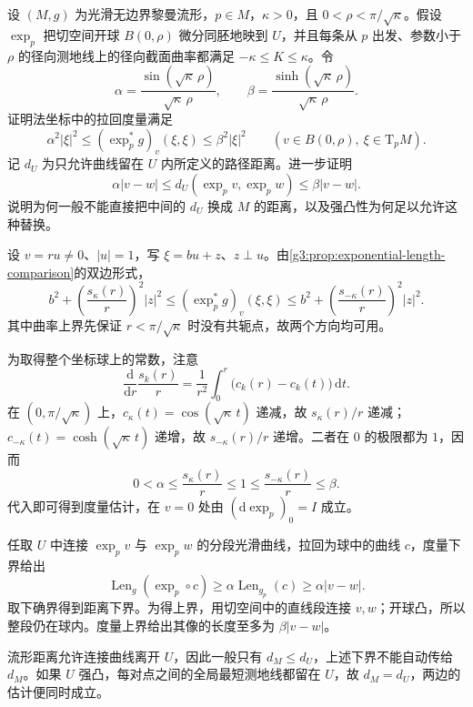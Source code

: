 \begin{exercise}\label{g3:ex:normal-coordinate-bilipschitz}
	设 \((M,g)\) 为光滑无边界黎曼流形，\(p\in M\)，\(\kappa>0\)，且 \(0<\rho<\pi/\sqrt\kappa\)。假设 \(\exp_p\) 把切空间开球 \(B(0,\rho)\) 微分同胚地映到 \(U\)，并且每条从 \(p\) 出发、参数小于 \(\rho\) 的径向测地线上的径向截面曲率都满足 \(-\kappa\le K\le\kappa\)。令
	\[
		\alpha=\frac{\sin(\sqrt\kappa\,\rho)}{\sqrt\kappa\,\rho},
		\qquad
		\beta=\frac{\sinh(\sqrt\kappa\,\rho)}{\sqrt\kappa\,\rho}.
	\]
	证明法坐标中的拉回度量满足
	\[
		\alpha^2|\xi|^2
		\le (\exp_p^*g)_v(\xi,\xi)
		\le\beta^2|\xi|^2
		\qquad(v\in B(0,\rho),\ \xi\in \mathrm{T}_pM).
	\]
	记 \(d_U\) 为只允许曲线留在 \(U\) 内所定义的路径距离。进一步证明
	\[
		\alpha|v-w|
		\le d_U(\exp_pv,\exp_pw)
		\le\beta|v-w|.
	\]
	说明为何一般不能直接把中间的 \(d_U\) 换成 \(M\) 的距离，以及强凸性为何足以允许这种替换。
\end{exercise}
\begin{solution}
	设 \(v=ru\ne0\)、\(|u|=1\)，写 \(\xi=bu+z\)、\(z\perp u\)。由\cref{g3:prop:exponential-length-comparison}的双边形式，
	\[
		b^2+\left(\frac{s_\kappa(r)}r\right)^2|z|^2
		\le(\exp_p^*g)_v(\xi,\xi)
		\le b^2+\left(\frac{s_{-\kappa}(r)}r\right)^2|z|^2.
	\]
	其中曲率上界先保证 \(r<\pi/\sqrt\kappa\) 时没有共轭点，故两个方向均可用。

	为取得整个坐标球上的常数，注意
	\[
		\frac{\mathrm d}{\mathrm dr}\frac{s_k(r)}r
		=\frac1{r^2}\int_0^r\bigl(c_k(r)-c_k(t)\bigr)\,\mathrm dt.
	\]
	在 \((0,\pi/\sqrt\kappa)\) 上，\(c_\kappa(t)=\cos(\sqrt\kappa\,t)\) 递减，故 \(s_\kappa(r)/r\) 递减；\(c_{-\kappa}(t)=\cosh(\sqrt\kappa\,t)\) 递增，故 \(s_{-\kappa}(r)/r\) 递增。二者在 \(0\) 的极限都为 \(1\)，因而
	\[
		0<\alpha\le\frac{s_\kappa(r)}r\le1
		\le\frac{s_{-\kappa}(r)}r\le\beta.
	\]
	代入即可得到度量估计，在 \(v=0\) 处由 \((\mathrm d\exp_p)_0=I\) 成立。

	任取 \(U\) 中连接 \(\exp_pv\) 与 \(\exp_pw\) 的分段光滑曲线，拉回为球中的曲线 \(c\)，度量下界给出
	\[
		\operatorname{Len}_g(\exp_p\circ c)
		\ge\alpha\operatorname{Len}_{g_p}(c)
		\ge\alpha|v-w|.
	\]
	取下确界得到距离下界。为得上界，用切空间中的直线段连接 \(v,w\)；开球凸，所以整段仍在球内。度量上界给出其像的长度至多为 \(\beta|v-w|\)。

	流形距离允许连接曲线离开 \(U\)，因此一般只有 \(d_M\le d_U\)，上述下界不能自动传给 \(d_M\)。如果 \(U\) 强凸，每对点之间的全局最短测地线都留在 \(U\)，故 \(d_M=d_U\)，两边的估计便同时成立。
\end{solution}

